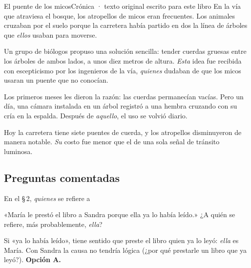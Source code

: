 \begin{texto}{El puente de los micos}{Crónica · texto original escrito para este libro}
\pa En la vía que atraviesa el bosque, los atropellos de micos eran frecuentes. Los animales cruzaban por el suelo porque
la carretera había partido en dos la línea de árboles que \emph{ellos} usaban para moverse.

\pa Un grupo de biólogos propuso una solución sencilla: tender cuerdas gruesas entre los árboles de ambos lados, a unos
diez metros de altura. \emph{Esta} idea fue recibida con escepticismo por los ingenieros de la vía, \emph{quienes} dudaban de
que los micos usaran un puente que no conocían.

\pa Los primeros meses les dieron la razón: las cuerdas permanecían vacías. Pero un día, una cámara instalada en un árbol
registró a una hembra cruzando con su cría en la espalda. Después de \emph{aquello}, el uso se volvió diario.

\pa Hoy la carretera tiene siete puentes de cuerda, y los atropellos disminuyeron de manera notable. \emph{Su} costo fue
menor que el de una sola señal de tránsito luminosa.
\end{texto}

\subsection{Preguntas comentadas}
\begin{comentada}{En el \S\,2, \emph{quienes} se refiere a}
\end{comentada}

\begin{reto}
«María le prestó el libro a Sandra porque ella ya lo había leído.» ¿A quién se refiere, más probablemente, \emph{ella}?
\end{reto}

\begin{retoresuelto}
Si «ya lo había leído», tiene sentido que preste el libro quien ya lo leyó: \emph{ella} es María. Con Sandra la causa no
tendría lógica (¿por qué prestarle un libro que ya leyó?). \textbf{Opción A.}
\end{retoresuelto}

